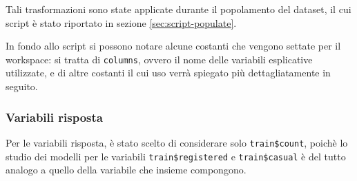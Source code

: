 Tali trasformazioni sono state applicate durante il popolamento del dataset, il
cui script è stato riportato in sezione \ref{sec:script-populate}.

In fondo allo script si possono notare alcune costanti che vengono settate per
il workspace: si tratta di \texttt{columns}, ovvero il nome delle variabili
esplicative utilizzate, e di altre costanti il cui uso verrà spiegato più
dettagliatamente in seguito.

\subsubsection{Variabili risposta}
Per le variabili risposta, è stato scelto di considerare solo
\texttt{train\$count}, poichè lo studio dei modelli per le variabili
\texttt{train\$registered} e \texttt{train\$casual} è del tutto analogo a
quello della variabile che insieme compongono.
